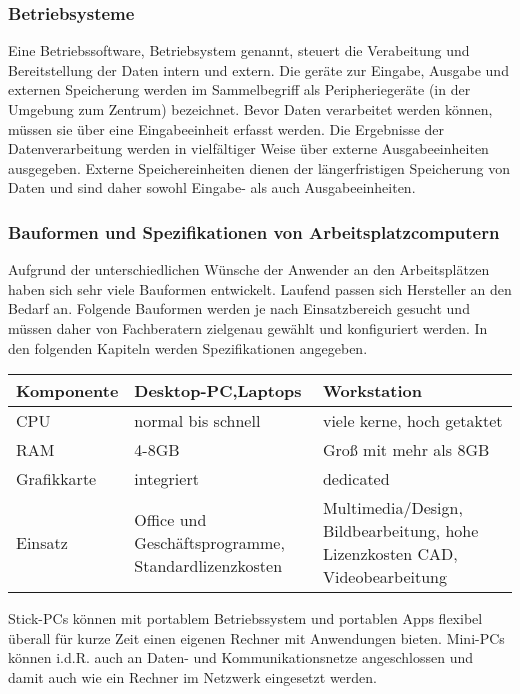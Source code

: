 \documentclass[a4paper, 12pt]{report}
\begin{document}
\subsubsection{Betriebsysteme}

Eine Betriebssoftware, Betriebsystem genannt, steuert die Verabeitung und 
Bereitstellung der Daten intern und extern. Die geräte zur Eingabe, Ausgabe und 
externen Speicherung werden im Sammelbegriff als Peripheriegeräte (in der 
Umgebung zum Zentrum) bezeichnet. Bevor Daten verarbeitet werden können, müssen
sie über eine Eingabeeinheit erfasst werden. Die Ergebnisse der 
Datenverarbeitung werden in vielfältiger Weise über externe Ausgabeeinheiten
ausgegeben. Externe Speichereinheiten dienen der längerfristigen Speicherung von 
Daten und sind daher sowohl Eingabe- als auch Ausgabeeinheiten. 

\subsubsection{Bauformen und Spezifikationen von Arbeitsplatzcomputern}

Aufgrund der unterschiedlichen Wünsche der Anwender an den Arbeitsplätzen haben
sich sehr viele Bauformen entwickelt. Laufend passen sich Hersteller an den 
Bedarf an. Folgende Bauformen werden je nach Einsatzbereich gesucht und müssen 
daher von Fachberatern zielgenau gewählt und konfiguriert werden. In den 
folgenden Kapiteln werden Spezifikationen angegeben. 

\begin{tabular}{ | l | p{6cm} | p{6cm} | }
    \hline
    Komponente & Desktop-PC,Laptops & Workstation \\ \hline
    CPU & normal bis schnell & viele kerne, hoch getaktet \\ \hline
    RAM & 4-8GB & Groß mit mehr als 8GB \\ \hline
    Grafikkarte & integriert & dedicated \\ \hline
    Einsatz & Office und Geschäftsprogramme, \newline Standardlizenzkosten & 
    Multimedia/Design, Bildbearbeitung, \newline hohe Lizenzkosten CAD, 
    Videobearbeitung \\
    \hline
\end{tabular}

\newpage
Stick-PCs können mit portablem Betriebssystem und portablen Apps flexibel 
überall für kurze Zeit einen eigenen Rechner mit Anwendungen bieten. Mini-PCs 
können i.d.R. auch an Daten- und Kommunikationsnetze angeschlossen und damit
auch wie ein Rechner im Netzwerk eingesetzt werden. \\
\end{document}
